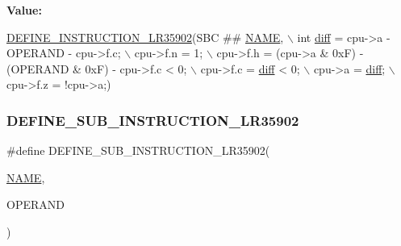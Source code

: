 {\bfseries Value\+:}
\begin{DoxyCode}
\mbox{\hyperlink{isa-lr35902_8c_a3128fc43c5d01e8b51f67901c0b4b5ef}{DEFINE\_INSTRUCTION\_LR35902}}(SBC ## \mbox{\hyperlink{inflate_8h_a164ea0159d5f0b5f12a646f25f99eceaa67bc2ced260a8e43805d2480a785d312}{NAME}}, \(\backslash\)
        \textcolor{keywordtype}{int} \mbox{\hyperlink{isa-lr35902_8c_a65f3a8178e1f997a7a19a988bb0f4e1a}{diff}} = cpu->a - OPERAND - cpu->f.c; \(\backslash\)
        cpu->f.n = 1; \(\backslash\)
        cpu->f.h = (cpu->a & 0xF) - (OPERAND & 0xF) - cpu->f.c < 0; \(\backslash\)
        cpu->f.c = \mbox{\hyperlink{isa-lr35902_8c_a65f3a8178e1f997a7a19a988bb0f4e1a}{diff}} < 0; \(\backslash\)
        cpu->a = \mbox{\hyperlink{isa-lr35902_8c_a65f3a8178e1f997a7a19a988bb0f4e1a}{diff}}; \(\backslash\)
        cpu->f.z = !cpu->a;)
\end{DoxyCode}
\mbox{\label{isa-lr35902_8c_a1808b056e65c96fea92bb610a36196fa}} 
\subsubsection{\texorpdfstring{D\+E\+F\+I\+N\+E\+\_\+\+S\+U\+B\+\_\+\+I\+N\+S\+T\+R\+U\+C\+T\+I\+O\+N\+\_\+\+L\+R35902}{DEFINE\_SUB\_INSTRUCTION\_LR35902}}
{\footnotesize\ttfamily \#define D\+E\+F\+I\+N\+E\+\_\+\+S\+U\+B\+\_\+\+I\+N\+S\+T\+R\+U\+C\+T\+I\+O\+N\+\_\+\+L\+R35902(\begin{DoxyParamCaption}\item[{}]{\mbox{\hyperlink{inflate_8h_a164ea0159d5f0b5f12a646f25f99eceaa67bc2ced260a8e43805d2480a785d312}{N\+A\+ME}},  }\item[{}]{O\+P\+E\+R\+A\+ND }\end{DoxyParamCaption})}

